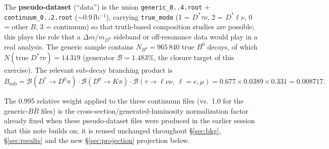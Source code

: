 \documentclass[11pt]{article}
\newcommand{\BF}{\mathcal{B}}
\begin{document}
\begin{table}[htbp]
\centering\footnotesize
\setlength{\tabcolsep}{4pt}
\caption{MC samples used in this note. All samples existed in
\texttt{data/} before this analysis; none were regenerated.}
\label{tab:samples}
\end{table}

The \textbf{pseudo-dataset} (``data'') is the union
\texttt{generic\_0..4.root} $+$ \texttt{continuum\_0..2.root}
($\sim$0.9\,fb$^{-1}$), \linebreak carrying \texttt{true\_mode} (1 = $D^{*}\tau\nu$,
2 = $D^{*}\ell\nu$, 0 = other $B$, 3 = continuum) so that truth-based
composition studies are possible; this plays the role that a
$\Delta m/m_{D^0}$ sideband or off-resonance data would play in a real
analysis. The generic sample contains $N_{B^0} = 965\,840$ true $B^0$
decays, of which $N(\text{true } D^{*}\tau\nu) = 14\,319$ (generator
$\BF = 1.483\%$, the closure target of this exercise). The relevant
sub-decay branching product is
\begin{equation*}
B_{\mathrm{sub}}
 = \BF(D^{*}\to D^0\pi)\cdot\BF(D^0\to K\pi)\cdot\BF(\tau\to\ell\nu\nu,\ \ell=e,\mu)
 = 0.677 \times 0.0389 \times 0.331 = \mathbf{0.008717}.
\end{equation*}

The 0.995 relative weight applied to the three continuum files (vs.\ 1.0
for the generic-$B\bar B$ files) is the
cross-section/generated-luminosity normalization factor already fixed
when these pseudo-dataset files were produced in the earlier session that
this note builds on; it is reused unchanged throughout \S\ref{sec:bkg},
\S\ref{sec:results} and the new \S\ref{sec:projection} projection below.
\end{document}
